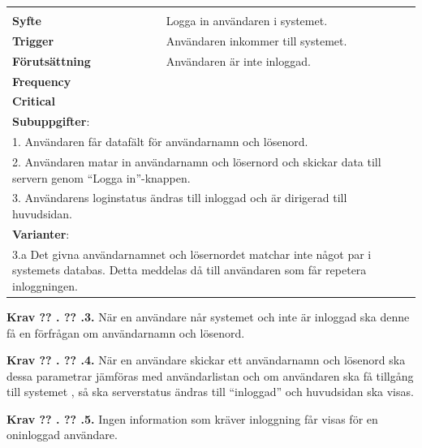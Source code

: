 \documentclass[a4paper]{article}
\newcommand\getcurrentref[1]{%
 \ifnumequal{\value{#1}}{0}
  {??}
  {\the\value{#1}}%
}
\newcommand\requirement[2]{
	\numberedrow{Krav}{#1}{#2}
}
\newcommand\scenario[2] {
	\numberedrow{Scenario}{#1}{#2}
}
\newcommand\numberedrow[3]{
	\noindent
	\textbf{#1 \getcurrentref{section}.\getcurrentref{subsection}.#2.} #3
	
}
\begin{document}
\begin{table}[htbp]
\begin{tabular}{ | p{2cm} p{11cm} | }
   
        \hline
	\multicolumn{2}{|p{13cm}|}{ \indent\scenario{1}} \\
    \textbf{Syfte} & Logga in användaren i systemet.\\
    \textbf{Trigger} & Användaren inkommer till systemet. \\
    \textbf{Förutsättning} & Användaren är inte inloggad.\\
    \textbf{Frequency} & \\
    \textbf{Critical} & \\
    \hline

	\multicolumn{2}{|p{13cm}|}{ \textbf{Subuppgifter}:} \\

	\multicolumn{2}{|p{13cm}|}{ 1. Användaren får datafält för användarnamn och lösenord.}\\
	\multicolumn{2}{|p{13cm}|}{ 2. Användaren matar in användarnamn och lösernord och skickar data till servern genom ``Logga in''-knappen.} \\	
	\multicolumn{2}{|p{13cm}|}{ 3. Användarens loginstatus ändras till inloggad och är dirigerad till huvudsidan. }\\ \hline
    \multicolumn{2}{|p{13cm}|}{ \textbf{Varianter}: }\\
	\multicolumn{2}{|p{13cm}|}{ 3.a Det givna användarnamnet och lösernordet matchar inte något par i systemets databas. Detta meddelas då till användaren som får repetera inloggningen.}\\
	    \hline


\end{tabular}
\end{table}

\requirement{3}{När en användare når systemet och inte är inloggad ska denne få en förfrågan om användarnamn och lösenord.}
\requirement{4}{När en användare skickar ett användarnamn och lösenord ska dessa parametrar jämföras med användarlistan och om användaren ska få tillgång till systemet , så ska serverstatus ändras till ``inloggad'' och huvudsidan ska visas.}
\requirement{5}{Ingen information som kräver inloggning får visas för en oninloggad användare.}
\end{document}
